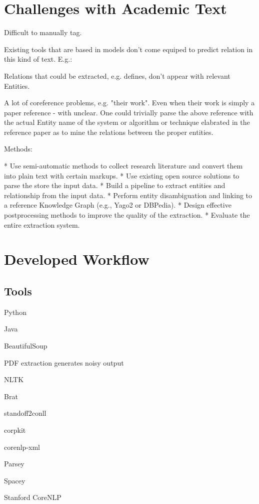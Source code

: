 \documentclass[11pt,a4paper,openright]{memoir}
\begin{document}
\chapter{Challenges with Academic Text}

Difficult to manually tag.

Existing tools that are based in models don't come equiped to predict relation in this kind of text. E.g.:

Relations that could be extracted, e.g. deﬁnes, don't appear with relevant Entities.

A lot of coreference problems, e.g. "their work". Even when their work is simply a paper reference - with unclear. One could trivially parse the above reference with the actual Entity name of the system or algorithm or technique elabrated in the reference paper as to mine the relations between the proper entities.

Methods:

* Use semi-automatic methods to collect research literature and convert them into plain text with certain markups. 
* Use existing open source solutions to parse the store the input data. 
* Build a pipeline to extract entities and relationship from the input data. 
* Perform entity disambiguation and linking to a reference Knowledge Graph (e.g., Yago2 or DBPedia). 
* Design effective postprocessing methods to improve the quality of the extraction.
* Evaluate the entire extraction system.


\chapter{Developed Workflow}

\section{Tools}

Python

Java

BeautifulSoup

PDF extraction generates noisy output

NLTK

Brat

standoff2conll

corpkit

corenlp-xml

Parsey

Spacey

Stanford CoreNLP
\end{document}
